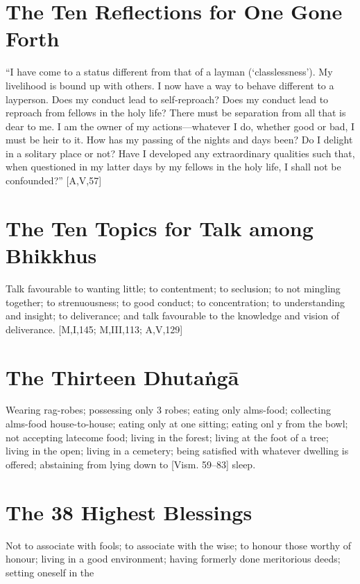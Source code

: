 \section{The Ten Reflections for One Gone Forth}

“I have come to a status different from that of
a layman (‘classlessness’). My livelihood is
bound up with others. I now have a way to
behave different to a layperson. Does my conduct lead to self-reproach? Does my conduct
lead to reproach from fellows in the holy life?
There must be separation from all that is dear
to me. I am the owner of my actions—whatever I do, whether good or bad, I must be heir
to it. How has my passing of the nights and
days been? Do I delight in a solitary place or
not? Have I developed any extraordinary qualities such that, when questioned in my latter
days by my fellows in the holy life, I shall not
be confounded?”
[A,V,57]

\section{The Ten Topics for Talk among Bhikkhus}

Talk favourable to wanting little; to contentment; to seclusion; to not mingling together;
to strenuousness; to good conduct; to concentration; to understanding and insight; to
deliverance; and talk favourable to the knowledge and vision of deliverance.
[M,I,145; M,III,113; A,V,129]

\section{The Thirteen Dhutaṅgā}

Wearing rag-robes; possessing only 3 robes;
eating only alms-food; collecting alms-food
house-to-house; eating only at one sitting; eating onl y from the bowl; not accepting latecome food; living in the forest; living at the
foot of a tree; living in the open; living in a
cemetery; being satisfied with whatever dwelling is offered; abstaining from lying down to
[Vism. 59–83]
sleep.

\section{The 38 Highest Blessings}

Not to associate with fools; to associate with
the wise; to honour those worthy of honour;
living in a good environment; having formerly
done meritorious deeds; setting oneself in the

